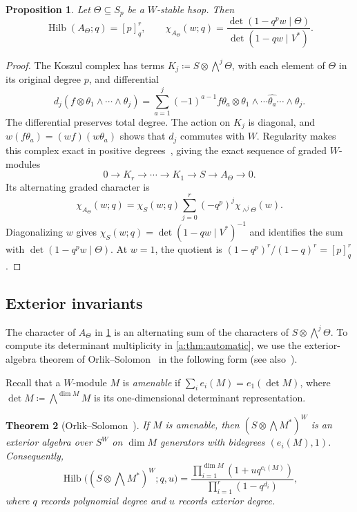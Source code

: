 \documentclass[10pt,a4paper]{amsart}
\newcommand{\defeq}{\coloneqq}
\newcommand{\defn}[1]{\emph{\color{darkblue}#1}}
\newtheorem{theorem}{Theorem}[section]
\newtheorem{proposition}[theorem]{Proposition}
\theoremstyle{definition}
\DeclareMathOperator{\Hilb}{Hilb}\DeclareMathOperator{\Res}{Res}
\begin{document}
\begin{proposition}\label{prop:koszul}
Let $\Theta\subseteq S_p$ be a $W$-stable hsop. Then
\[
 \Hilb(A_\Theta;q)=[p]_q^r,
 \qquad
 \chi_{A_\Theta}(w;q)=
 \frac{\det(1-q^p w\mid\Theta)}{\det(1-qw\mid V^*)}.
\]
\end{proposition}
\begin{proof}
The Koszul complex has terms
$K_j\defeq S\otimes\bigwedge^j\Theta$, with each element of $\Theta$
in its original degree $p$, and differential
\[
 d_j(f\otimes\theta_1\wedge\cdots\wedge\theta_j)
 =\sum_{a=1}^j(-1)^{a-1}f\theta_a\otimes
       \theta_1\wedge\cdots\widehat{\theta_a}\cdots\wedge\theta_j.
\]
The differential preserves total degree. The action on $K_j$ is diagonal,
and $w(f\theta_a)=(wf)(w\theta_a)$ shows that $d_j$ commutes with $W$.
Regularity makes this complex exact in positive degrees~\cite[Lemma~15.31.2]{Stacks},
giving the exact sequence of graded $W$-modules
\[
 0\longrightarrow K_r\longrightarrow\cdots\longrightarrow K_1
 \longrightarrow S\longrightarrow A_\Theta\longrightarrow0.
\]
Its alternating graded character is
\[
 \chi_{A_\Theta}(w;q)
 =\chi_S(w;q)\sum_{j=0}^r(-q^p)^j\chi_{\wedge^j\Theta}(w).
\]
Diagonalizing $w$ gives
$\chi_S(w;q)=\det(1-qw\mid V^*)^{-1}$ and identifies the sum with
$\det(1-q^pw\mid\Theta)$. At $w=1$, the quotient is
$(1-q^p)^r/(1-q)^r=[p]_q^r$.
\end{proof}

\subsection{Exterior invariants}\label{b:sec:exterior}

The character of $A_\Theta$ in \cref{prop:koszul} is an alternating
sum of the characters of $S\otimes\bigwedge^j\Theta$. To compute its
determinant multiplicity in \cref{a:thm:automatic},
we use the exterior-algebra theorem of
Orlik--Solomon~\cite[Theorem~3.1]{OS} in the following form
(see also~\cite[Theorem~2.7]{AW}).

Recall that a $W$-module $M$ is \defn{amenable} if
$\sum_i e_i(M)=e_1(\det M)$, where
$\det M\defeq\bigwedge^{\dim M}M$ is its one-dimensional determinant
representation.

\begin{theorem}[{Orlik--Solomon~\cite[Theorem~3.1]{OS}}]
\label{b:thm:OS}
If $M$ is amenable, then $(S\otimes\bigwedge M^*)^W$ is an exterior
algebra over $S^W$ on $\dim M$ generators with bidegrees
$(e_i(M),1)$. Consequently,
\[
 \Hilb\bigl((S\otimes\textstyle\bigwedge M^*)^W;q,u\bigr)
 =\frac{\prod_{i=1}^{\dim M}(1+uq^{e_i(M)})}
        {\prod_{i=1}^r(1-q^{d_i})},
\]
where $q$ records polynomial degree and $u$ records exterior degree.
\end{theorem}
\end{document}
